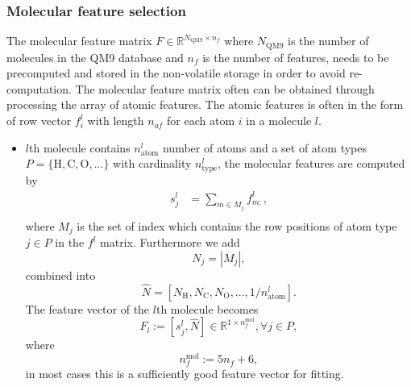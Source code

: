 \documentclass[12pt]{article}
\begin{document}
\subsubsection{Molecular feature selection}
The molecular feature matrix $F \in \mathbb{R}^{N_\text{QM9} \times n_f}$ where $N_\text{QM9}$ is the number of molecules in the QM9 database and $n_f$ is the number of features, needs to be precomputed and stored in the non-volatile storage in order to avoid re-computation.
The molecular feature matrix often can be obtained through processing the array of atomic features.
The atomic features is often in the form of row vector $f^l_{i}$ with length $n_{af}$ for each atom $i$ in a molecule $l$.
\begin{itemize}
    \item $l$th molecule contains $n^l_\text{atom}$ number of atoms and a set of atom types $P = \{\text{H}, \text{C}, \text{O}, ...\}$ with cardinality $n^l_\text{type}$,
	the molecular features are computed by
        \begin{equation}
			\label{eq:acsf}
            \begin{split}
                s^l_{j} &= \sum_{m \in M_j} f^l_{m:}, \\
            \end{split}
        \end{equation}
		where $M_j$ is the set of index which contains the row positions of atom type $j \in P$ in the $f^l$ matrix. 
		Furthermore we add
		\begin{equation}
			N_j = |M_j|,
		\end{equation}
		combined into
		\begin{equation}
			\hat{N} = [N_\text{H}, N_\text{C}, N_\text{O},..., 1/n^l_\text{atom}].
		\end{equation}
		The feature vector of the $l$th molecule becomes
		\begin{equation}
			F_l := [s^l_{j}, \hat{N} ] \in \mathbb{R}^{1 \times n_f^\text{mol}}, \forall j \in P,
        \end{equation}
		where
		\begin{equation}
    		n_f^\text{mol} := 5n_f + 6,
    	\end{equation}
		in most cases this is a sufficiently good feature vector for fitting.
		

\end{itemize}
\end{document}
